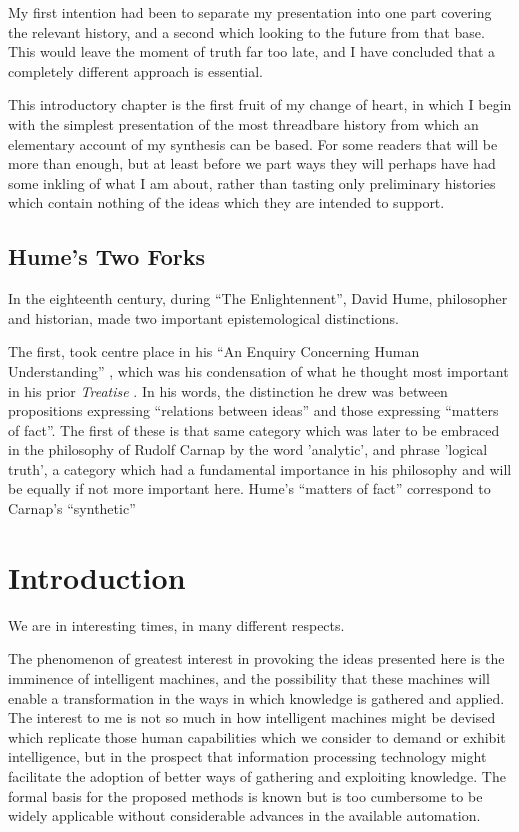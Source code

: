 \documentclass[10pt,titlepage]{book}
\begin{document}
My first intention had been to separate my presentation into one part covering the relevant history, and a second which looking to the future from that base.
This would leave the moment of truth far too late, and I have concluded that a completely different approach is essential.

This introductory chapter is the first fruit of my change of heart, in which I begin with the simplest presentation of the most threadbare history from which an elementary account of my synthesis can be based.
For some readers that will be more than enough, but at least before we part ways they will perhaps have had some inkling of what I am about, rather than tasting only preliminary histories which contain nothing of the ideas which they are intended to support.

\section{Hume's Two Forks}

In the eighteenth century, during ``The Enlightennent'', David Hume, philosopher and historian, made two important epistemological distinctions.

The first, took centre place in his ``An Enquiry Concerning Human Understanding'' \cite{hume48}, which was his condensation of what he thought most important in his prior \emph{Treatise} \cite{hume39}.
In his words, the distinction he drew was between propositions expressing ``relations between ideas'' and those expressing ``matters of fact''.
The first of these is that same category which was later to be embraced in the philosophy of Rudolf Carnap by the word 'analytic', and phrase 'logical truth', a category which had a fundamental importance in his philosophy and will be equally if not more important here.
Hume's ``matters of fact'' correspond to Carnap's ``synthetic'' 










\chapter{Introduction}

We are in interesting times, in many different respects.

The phenomenon of greatest interest in provoking the ideas presented here is the imminence of intelligent machines, and the possibility that these machines will enable a transformation in the ways in which knowledge is gathered and applied.
The interest to me is not so much in how intelligent machines might be devised which replicate those human capabilities which we consider to demand or exhibit intelligence, but in the prospect that information processing technology might facilitate the adoption of better ways of gathering and exploiting knowledge.
The formal basis for the proposed methods is known but is too cumbersome to be widely applicable without considerable advances in the available automation.
\end{document}
